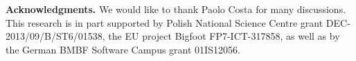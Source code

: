 \documentclass[preprint,12pt]{elsarticle}
\newcommand{\maciek}[1]{\textcolor{brown}{maciek: #1}}
\begin{document}




\textbf{Acknowledgments.} We would like to thank 
Paolo Costa for many discussions. 
This research is in part supported by Polish National Science Centre grant DEC-2013/09/B/ST6/01538, the EU project Bigfoot FP7-ICT-317858,
as well as by the German BMBF Software Campus grant 01IS12056.

%
{\footnotesize \renewcommand{\baselinestretch}{.9}


}

\end{document}
